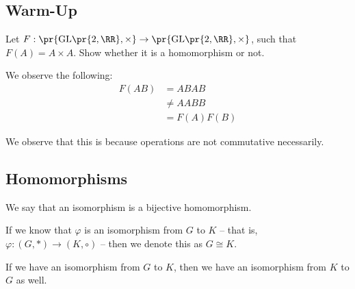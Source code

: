 \documentclass[openany]{book}
\begin{document}
\subsection{Warm-Up}
\begin{hw}
	Let $F: \pr{\mathrm{GL}\pr{2, \RR}, \times} \rightarrow \pr{\mathrm{GL}\pr{2, \RR}, \times}$, such that $F(A) = A \times A$. Show whether it is a homomorphism or not.
\end{hw}
\begin{solution}
	We observe the following:
	\begin{align*}
		F(AB) &= ABAB \\
		&\neq AABB \\
		&= F(A)F(B)
	\end{align*}

	We observe that this is because operations are not commutative necessarily.
\end{solution}

\subsection{Homomorphisms}
\begin{defn}[Isomorphism]
	We say that an isomorphism is a bijective homomorphism.
\end{defn}

If we know that $\varphi$ is an isomorphism from $G$ to $K$ -- that is, $\varphi: (G, *) \rightarrow (K, \circ)$ -- then we denote this as $G \cong K$.

\begin{rmk}
	If we have an isomorphism from $G$ to $K$, then we have an isomorphism from $K$ to $G$ as well.
\end{rmk}
\end{document}
